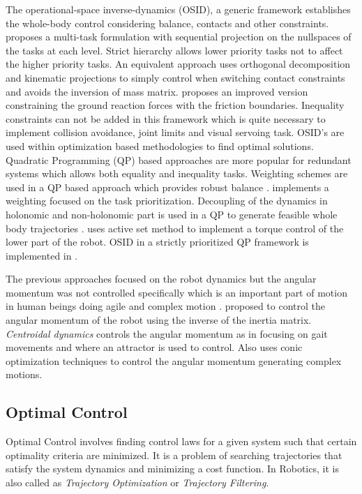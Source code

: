 The operational-space inverse-dynamics (OSID), a generic framework  establishes the whole-body control considering balance, contacts and other constraints. \cite{Khatib2004} proposes a multi-task formulation with sequential projection on  the nullspaces of the tasks at each level. Strict hierarchy allows lower priority tasks not to affect the higher priority tasks. An equivalent approach \cite{mistry2010inverse} uses orthogonal decomposition and kinematic projections to simply control when switching contact constraints and avoids the inversion of mass matrix. \cite{Righetti2011a,Righetti2011} proposes an improved version constraining the ground reaction forces with the friction boundaries. Inequality constraints can not be added in this framework which is quite necessary to implement collision avoidance, joint limits and visual servoing task. OSID's are used within optimization based methodologies to find optimal solutions. Quadratic Programming (QP) based approaches are more popular for redundant systems which allows both equality and inequality tasks. Weighting schemes are used in a QP based approach which provides robust balance \cite{collette2008robust}. \cite{Salini2011} implements a weighting focused on the task prioritization. Decoupling of the dynamics in holonomic and non-holonomic part is used in a QP to generate feasible whole body trajectories \cite{bouyarmane2012dynamics,wieber2006holonomy}. \cite{herzog2013experiments} uses active set method to implement a torque control of the lower part of the robot. OSID in a strictly prioritized QP framework is implemented in \cite{Saab2013}. 


The previous approaches focused on the robot dynamics but the angular momentum was not controlled specifically which is an important part of motion in human beings doing agile and complex motion \cite{popovic2004angular}. \cite{kajita2003resolved} proposed to control the angular momentum of the robot using the inverse of the inertia matrix. \textit{Centroidal dynamics} controls the angular momentum as in \cite{hofmann2009exploiting} focusing on gait movements and \cite{moro2013attractor} where an attractor is used to control. Also \cite{wensing2013generation} uses conic optimization techniques to control the angular momentum generating complex motions.

\subsection{Optimal Control}
Optimal Control involves finding control laws for a given system such that certain optimality criteria are minimized. It is a problem of searching trajectories that satisfy the system dynamics and minimizing a cost function. In Robotics, it is also called as \textit{Trajectory Optimization} or \textit{Trajectory Filtering}.

